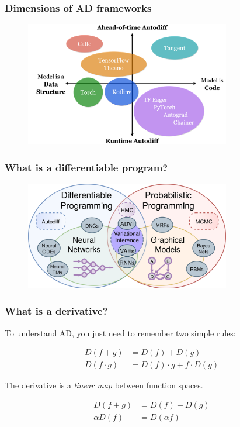 \documentclass{beamer}
\begin{document}
    \begin{frame}
        \frametitle{Dimensions of AD frameworks}
        \begin{figure}[H]
            \centering
            \includegraphics[width=0.8\textwidth]{ad_dsls.png}
        \end{figure}
    \end{frame}

    \begin{frame}
        \frametitle{What is a differentiable program?}
        \begin{figure}[H]
            \centering
            \includegraphics[width=0.8\textwidth]{diff_prob_prog.png}
        \end{figure}
    \end{frame}

    \begin{frame}
        \frametitle{What is a derivative?}

        To understand AD, you just need to remember two simple rules:

        \begin{align*}
            D(f + g) &= D(f) + D(g) \\
            D(f \cdot g) &= D(f) \cdot g + f \cdot D(g)
        \end{align*}

        The derivative is a \textit{linear map} between function spaces.

        \begin{align*}
            D(f + g) &= D(f) + D(g) \\
            \alpha D(f) &= D(\alpha f)
        \end{align*}
    \end{frame}
\end{document}
